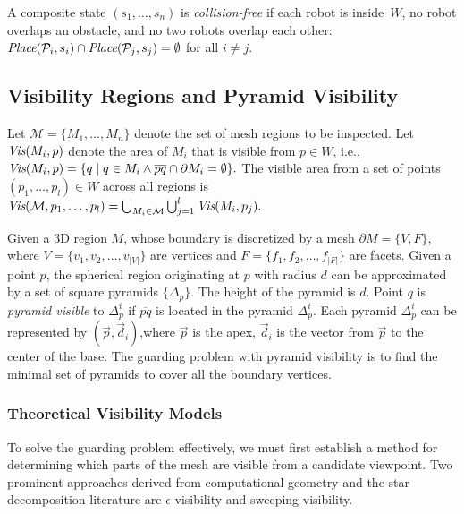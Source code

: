 \documentclass[letterpaper, 10 pt, conference]{ieeeconf}  %
\begin{document}
A composite state $(s_1,\ldots,s_n)$ is \emph{collision-free} if each robot is inside~$W$, no robot overlaps an obstacle, and no two robots overlap each other:
$\mbox{\em Place}({\cal P}_i,s_i) \cap \mbox{\em Place}({\cal P}_j,s_j) = \emptyset$ for all $i \neq j$.


\subsection{Visibility Regions and Pyramid Visibility}

Let $\mathcal{M} = \{M_1, \ldots, M_n\}$ denote the set of mesh regions to be inspected.
Let $\mbox{\em Vis}(M_i,p)$ denote the area of $M_i$ that is
visible from $p \in W$, i.e.,
$\mbox{\em Vis}(M_i,p) = \{q \mid q \in 
M_i \wedge \overline{pq} \cap \partial M_i = \emptyset\}.$ 
The visible area from a set of
points $(p_1 ,\ldots,p_l) \in W$ across all regions is
$\mbox{\em Vis}(\mathcal{M}, p_1,\ldots,p_l) =
 \bigcup_{M_i \in \mathcal{M}}
\bigcup_{j=1}^l \mbox{\em Vis}(M_i, p_j).$



Given a 3D region $M$, whose boundary is discretized by a 
mesh $\partial M=\{V,F\}$, where 
$V=\{v_1,v_2,\ldots,v_{|V|}\}$ are vertices and 
$F=\{f_1,f_2,\ldots,f_{|F|}\}$ are facets.  
%
Given a point $p$, the spherical region originating at $p$ with radius $d$ can be approximated by a set of square pyramids $\{\Delta_p\}$. The height of the pyramid is $d$. Point $q$ is \emph{pyramid visible} to $\Delta^i_p$ if $\overline{pq}$ is located in the pyramid $\Delta^i_p$. 
Each pyramid $\Delta^i_p$ can be represented by $(\vec{p},\vec{d}_i)$,where $\vec{p}$ is the apex, $\vec{d}_i$ is the vector from $\vec{p}$ to the center of the base. The guarding problem with pyramid visibility is to find the minimal set of pyramids to cover all the boundary vertices. 

\subsubsection{Theoretical Visibility Models}
To solve the guarding problem effectively, we must first establish a method for determining which parts of the mesh are visible from a candidate viewpoint. Two prominent approaches derived from computational geometry and the star-decomposition literature are $\epsilon$-visibility and sweeping visibility.
\end{document}
